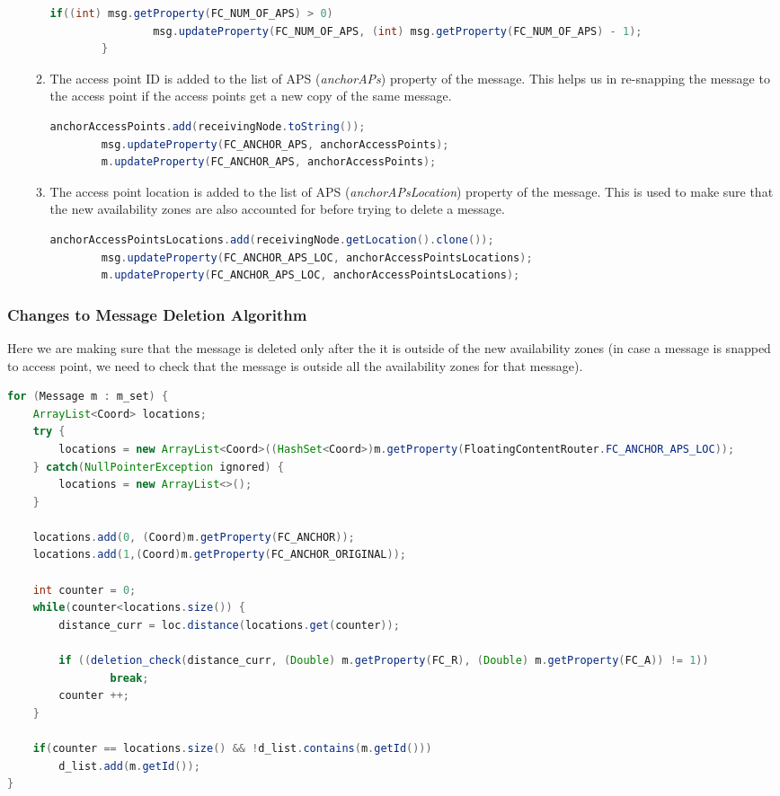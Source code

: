 \begin{enumerate}
\begin{enumerate}
\begin{lstlisting}[language=java]
			if((int) msg.getProperty(FC_NUM_OF_APS) > 0)
				msg.updateProperty(FC_NUM_OF_APS, (int) msg.getProperty(FC_NUM_OF_APS) - 1);
		}
		\end{lstlisting}
		\item The access point ID is added to the list of APS (\textit{anchorAPs}) property of the message. This helps us in re-snapping the message to the access point if the access points get a new copy of the same message.
		\begin{lstlisting}[language=java]
		anchorAccessPoints.add(receivingNode.toString());
		msg.updateProperty(FC_ANCHOR_APS, anchorAccessPoints);
		m.updateProperty(FC_ANCHOR_APS, anchorAccessPoints);
		\end{lstlisting}
		\item The access point location is added to the list of APS (\textit{anchorAPsLocation}) property of the message. This is used to make sure that the new availability zones are also accounted for before trying to delete a message.
		\begin{lstlisting}[language=java]
		anchorAccessPointsLocations.add(receivingNode.getLocation().clone());
		msg.updateProperty(FC_ANCHOR_APS_LOC, anchorAccessPointsLocations);
		m.updateProperty(FC_ANCHOR_APS_LOC, anchorAccessPointsLocations);
		\end{lstlisting}
		\end{enumerate}
\end{enumerate}
\subsubsection{Changes to Message Deletion Algorithm}
Here we are making sure that the message is deleted only after the it is outside of the new availability zones (in case a message is snapped to access point, we need to check that the message is outside all the availability zones for that message).

\begin{lstlisting}[language=java]
for (Message m : m_set) {
	ArrayList<Coord> locations;
	try {
		locations = new ArrayList<Coord>((HashSet<Coord>)m.getProperty(FloatingContentRouter.FC_ANCHOR_APS_LOC));
	} catch(NullPointerException ignored) {
		locations = new ArrayList<>();
	}

	locations.add(0, (Coord)m.getProperty(FC_ANCHOR));
	locations.add(1,(Coord)m.getProperty(FC_ANCHOR_ORIGINAL));

	int counter = 0;
	while(counter<locations.size()) {
		distance_curr = loc.distance(locations.get(counter));

		if ((deletion_check(distance_curr, (Double) m.getProperty(FC_R), (Double) m.getProperty(FC_A)) != 1))
				break;
		counter ++;
	}

	if(counter == locations.size() && !d_list.contains(m.getId()))
		d_list.add(m.getId());
}
\end{lstlisting}
